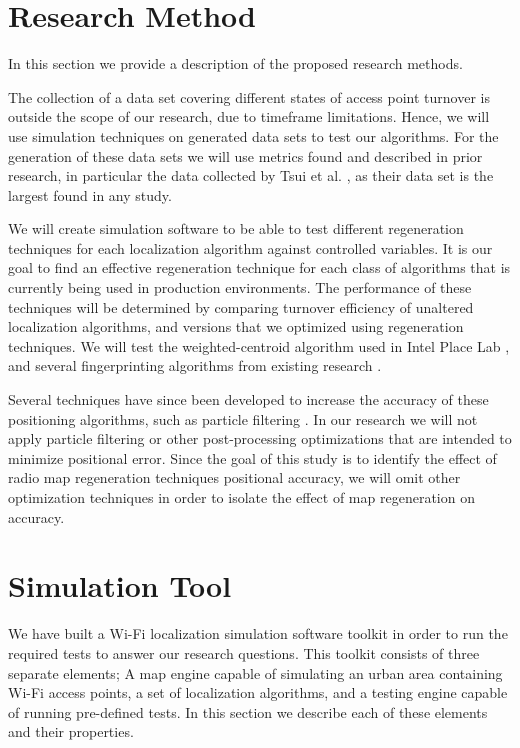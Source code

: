 \documentclass{sig-alternate-br}
\begin{document}
\section{Research Method}
In this section we provide a description of the proposed research methods. 

The collection of a data set covering different states of access point turnover is outside the scope of our research, due to timeframe limitations. Hence, we will use simulation techniques on generated data sets to test our algorithms. For the generation of these data sets we will use metrics found and described in prior research, in particular the data collected by Tsui et al. \cite{tsui:war-walking}, as their data set is the largest found in any study.

We will create simulation software to be able to test different regeneration techniques for each localization algorithm against controlled variables. It is our goal to find an effective regeneration technique for each class of algorithms that is currently being used in production environments. The performance of these techniques will be determined by comparing turnover efficiency of unaltered localization algorithms, and versions that we optimized using regeneration techniques. We will test the weighted-centroid algorithm used in Intel Place Lab \cite{cheng:metropolitan-scale}, and several fingerprinting algorithms from existing research \cite{cheng:metropolitan-scale,tsui:war-walking}.

Several techniques have since been developed to increase the accuracy of these positioning algorithms, such as particle filtering \cite{hightower:particle-filter}. In our research we will not apply particle filtering or other post-processing optimizations that are intended to minimize positional error. Since the goal of this study is to identify the effect of radio map regeneration techniques positional accuracy, we will omit other optimization techniques in order to isolate the effect of map regeneration on accuracy.

\section{Simulation Tool}
We have built a Wi-Fi localization simulation software toolkit in order to run the required tests to answer our research questions. This toolkit consists of three separate elements; A map engine capable of simulating an urban area containing Wi-Fi access points, a set of localization algorithms, and a testing engine capable of running pre-defined tests.  In this section we describe each of these elements and their properties.
\end{document}
